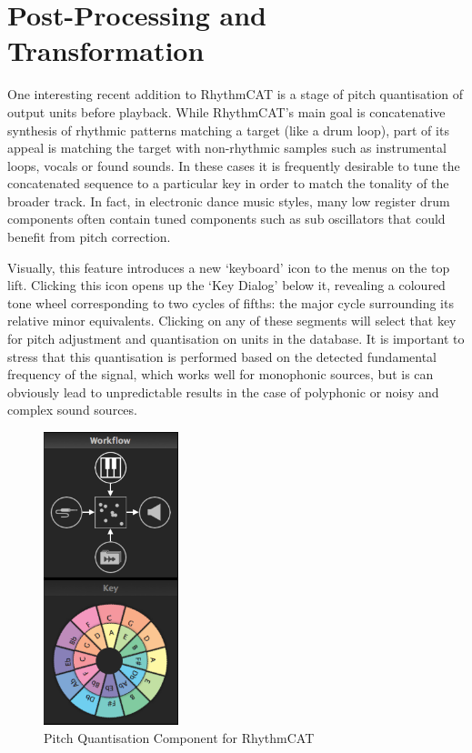 \section{Post-Processing and Transformation}

One interesting recent addition to RhythmCAT is a stage of pitch quantisation of output units before playback. While RhythmCAT’s main goal is concatenative synthesis of rhythmic patterns matching a target (like a drum loop), part of its appeal is matching the target with non-rhythmic samples such as instrumental loops, vocals or found sounds. In these cases it is frequently desirable to tune the concatenated sequence to a particular key in order to match the tonality of the broader track. In fact, in electronic dance music styles, many low register drum components often contain tuned components such as sub oscillators that could benefit from pitch correction.

Visually, this feature introduces a new `keyboard' icon to the menus on the top lift. Clicking this icon opens up the `Key Dialog' below it, revealing a coloured tone wheel corresponding to two cycles of fifths: the major cycle surrounding its relative minor equivalents. Clicking on any of these segments will select that key for pitch adjustment and quantisation on units in the database. It is important to stress that this quantisation is performed based on the detected fundamental frequency of the signal, which works well for monophonic sources, but is can obviously lead to unpredictable results in the case of polyphonic or noisy and complex sound sources.

\begin{figure}
	\begin{center}
		\includegraphics[width=0.35\textwidth]{ch06_rhythmcat/figures/tonewheel.png}
	\end{center}
	\caption[Pitch Quantisation Component for RhythmCAT]{Pitch Quantisation Component for RhythmCAT}
	\label{fig:rhythmcat_pitch}
\end{figure} 

